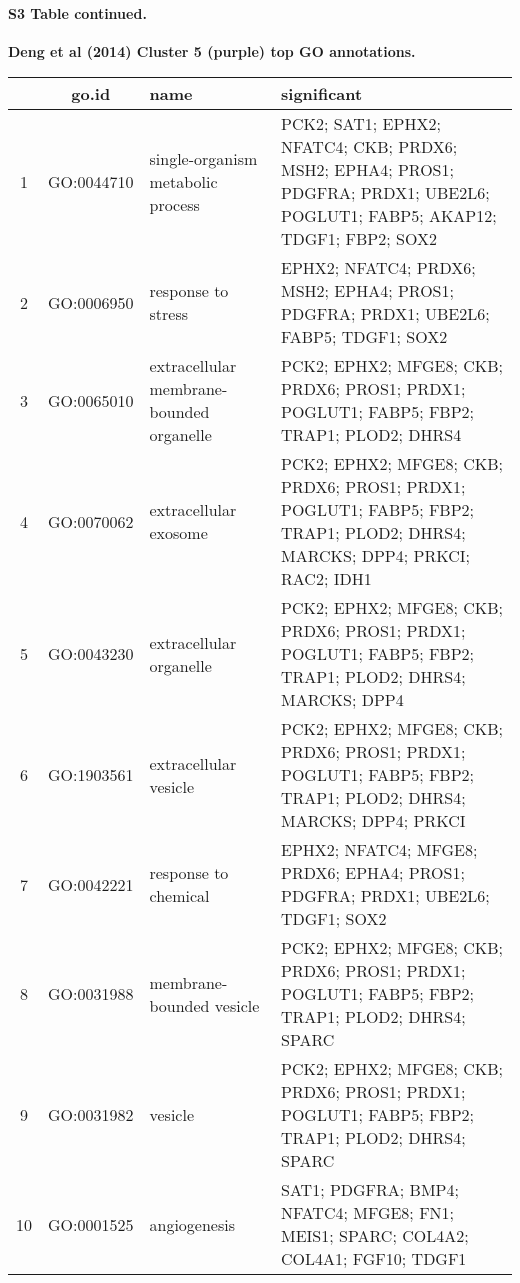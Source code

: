 \documentclass[10pt,letterpaper]{article}
\begin{document}
\clearpage





\clearpage
\paragraph*{S3 Table continued.}
{\bf Deng et al (2014) Cluster 5 (purple) top GO annotations.}
\begin{table}[!hp]
\begin{adjustwidth}{-.5in}{0in}
\begin{tabular}{|c|c|p{1.5in}|p{4in}|}
  \hline
 & go.id & name & significant \\
  \hline
1 & GO:0044710 & single-organism metabolic process & \footnotesize{PCK2; SAT1; EPHX2; NFATC4; CKB; PRDX6; MSH2; EPHA4; PROS1; PDGFRA; PRDX1; UBE2L6; POGLUT1; FABP5; AKAP12; TDGF1; FBP2; SOX2} \\
2 & GO:0006950 & response to stress & \footnotesize{EPHX2; NFATC4; PRDX6; MSH2; EPHA4; PROS1; PDGFRA; PRDX1; UBE2L6; FABP5; TDGF1; SOX2} \\
3 & GO:0065010 & extracellular membrane-bounded organelle & \footnotesize{PCK2; EPHX2; MFGE8; CKB; PRDX6; PROS1; PRDX1; POGLUT1; FABP5; FBP2; TRAP1; PLOD2; DHRS4} \\
4 & GO:0070062 & extracellular exosome  & \footnotesize{PCK2; EPHX2; MFGE8; CKB; PRDX6; PROS1; PRDX1; POGLUT1; FABP5; FBP2; TRAP1; PLOD2; DHRS4; MARCKS; DPP4; PRKCI; RAC2; IDH1} \\
5 & GO:0043230 & extracellular organelle & \footnotesize{PCK2; EPHX2; MFGE8; CKB; PRDX6; PROS1; PRDX1; POGLUT1; FABP5; FBP2; TRAP1; PLOD2; DHRS4; MARCKS; DPP4} \\
6 & GO:1903561 & extracellular vesicle & \footnotesize{PCK2; EPHX2; MFGE8; CKB; PRDX6; PROS1; PRDX1; POGLUT1; FABP5; FBP2; TRAP1; PLOD2; DHRS4; MARCKS; DPP4; PRKCI} \\
7 & GO:0042221 & response to chemical & \footnotesize{EPHX2; NFATC4; MFGE8; PRDX6; EPHA4; PROS1; PDGFRA; PRDX1; UBE2L6; TDGF1; SOX2} \\
8 & GO:0031988 & membrane-bounded vesicle & \footnotesize{PCK2; EPHX2; MFGE8; CKB; PRDX6; PROS1; PRDX1; POGLUT1; FABP5; FBP2; TRAP1; PLOD2; DHRS4; SPARC} \\
9 & GO:0031982 & vesicle & \footnotesize{PCK2; EPHX2; MFGE8; CKB; PRDX6; PROS1; PRDX1; POGLUT1; FABP5; FBP2; TRAP1; PLOD2; DHRS4; SPARC} \\
10 & GO:0001525 & angiogenesis & \footnotesize{SAT1; PDGFRA; BMP4; NFATC4; MFGE8; FN1; MEIS1; SPARC; COL4A2; COL4A1; FGF10; TDGF1} \\

\end{tabular}
\end{adjustwidth}
\end{table}
\end{document}
